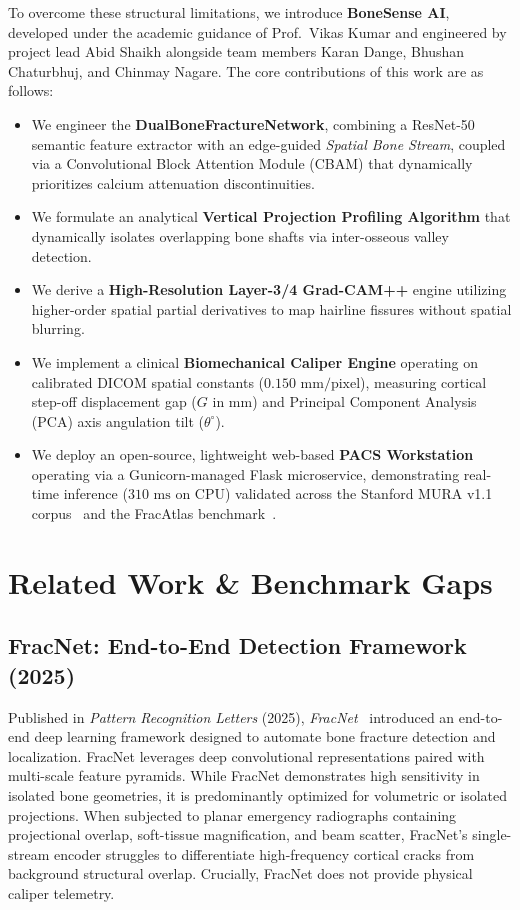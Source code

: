 \documentclass[3p,twocolumn]{elsarticle}
\begin{document}
To overcome these structural limitations, we introduce \textbf{BoneSense AI\texttrademark}, developed under the academic guidance of Prof.~Vikas Kumar and engineered by project lead Abid Shaikh alongside team members Karan Dange, Bhushan Chaturbhuj, and Chinmay Nagare. The core contributions of this work are as follows:
\begin{itemize}
    \item We engineer the \textbf{DualBoneFractureNetwork}, combining a ResNet-50 semantic feature extractor with an edge-guided \textit{Spatial Bone Stream}, coupled via a Convolutional Block Attention Module (CBAM) that dynamically prioritizes calcium attenuation discontinuities.
    \item We formulate an analytical \textbf{Vertical Projection Profiling Algorithm} that dynamically isolates overlapping bone shafts via inter-osseous valley detection.
    \item We derive a \textbf{High-Resolution Layer-3/4 Grad-CAM++} engine utilizing higher-order spatial partial derivatives to map hairline fissures without spatial blurring.
    \item We implement a clinical \textbf{Biomechanical Caliper Engine} operating on calibrated DICOM spatial constants ($0.150\text{ mm/pixel}$), measuring cortical step-off displacement gap ($G\text{ in mm}$) and Principal Component Analysis (PCA) axis angulation tilt ($\theta^\circ$).
    \item We deploy an open-source, lightweight web-based \textbf{PACS Workstation} operating via a Gunicorn-managed Flask microservice, demonstrating real-time inference ($310\text{ ms}$ on CPU) validated across the Stanford MURA v1.1 corpus~\cite{rajpurkar2017mura} and the FracAtlas benchmark~\cite{fracatlas2023}.
\end{itemize}

\section{Related Work \& Benchmark Gaps}

\subsection{FracNet: End-to-End Detection Framework (2025)}
Published in \textit{Pattern Recognition Letters} (2025), \textit{FracNet}~\cite{fracnet2025} introduced an end-to-end deep learning framework designed to automate bone fracture detection and localization. FracNet leverages deep convolutional representations paired with multi-scale feature pyramids. While FracNet demonstrates high sensitivity in isolated bone geometries, it is predominantly optimized for volumetric or isolated projections. When subjected to planar emergency radiographs containing projectional overlap, soft-tissue magnification, and beam scatter, FracNet's single-stream encoder struggles to differentiate high-frequency cortical cracks from background structural overlap. Crucially, FracNet does not provide physical caliper telemetry.
\end{document}
